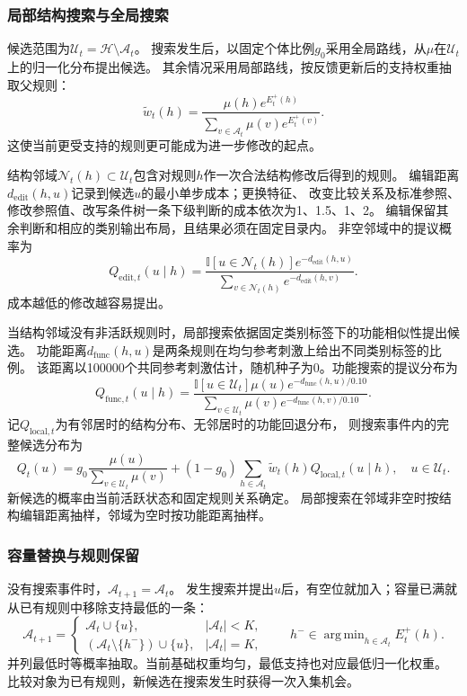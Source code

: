 \documentclass[11pt,a4paper]{article}
\numberwithin{equation}{section}
\newcommand{\ind}{\mathbb{I}}
\newcommand{\A}{\mathcal{A}}
\newcommand{\Hh}{\mathcal{H}}
\DeclareMathOperator*{\argmin}{arg\,min}
\begin{document}
\subsubsection{局部结构搜索与全局搜索}
\label{sec:proposal}
候选范围为$\mathcal U_t=\Hh\setminus\A_t$。
搜索发生后，以固定个体比例$g_0$采用全局路线，从$\mu$在$\mathcal U_t$上的归一化分布提出候选。
其余情况采用局部路线，按反馈更新后的支持权重抽取父规则：
\begin{equation}
\widetilde w_t(h)=\frac{\mu(h)e^{E_t^+(h)}}{\sum_{v\in\A_t}\mu(v)e^{E_t^+(v)}}.
\label{eq:updated-weight}
\end{equation}
这使当前更受支持的规则更可能成为进一步修改的起点。

结构邻域$\mathcal N_t(h)\subset\mathcal U_t$包含对规则$h$作一次合法结构修改后得到的规则。
编辑距离$d_{\mathrm{edit}}(h,u)$记录到候选$u$的最小单步成本；更换特征、
改变比较关系及标准参照、修改参照值、改写条件树一条下级判断的成本依次为1、1.5、1、2。
编辑保留其余判断和相应的类别输出布局，且结果必须在固定目录内。
非空邻域中的提议概率为
\begin{equation}
Q_{\mathrm{edit},t}(u\mid h)=
\frac{\ind[u\in\mathcal N_t(h)]e^{-d_{\mathrm{edit}}(h,u)}}
{\sum_{v\in\mathcal N_t(h)}e^{-d_{\mathrm{edit}}(h,v)}}.
\end{equation}
成本越低的修改越容易提出。

当结构邻域没有非活跃规则时，局部搜索依据固定类别标签下的功能相似性提出候选。
功能距离$d_{\mathrm{func}}(h,u)$是两条规则在均匀参考刺激上给出不同类别标签的比例。
该距离以100000个共同参考刺激估计，随机种子为0。功能搜索的提议分布为
\begin{equation}
Q_{\mathrm{func},t}(u\mid h)=
\frac{\ind[u\in\mathcal U_t]\mu(u)e^{-d_{\mathrm{func}}(h,u)/0.10}}
{\sum_{v\in\mathcal U_t}\mu(v)e^{-d_{\mathrm{func}}(h,v)/0.10}}.
\end{equation}
记$Q_{\mathrm{local},t}$为有邻居时的结构分布、无邻居时的功能回退分布，
则搜索事件内的完整候选分布为
\begin{equation}
Q_t(u)=g_0\frac{\mu(u)}{\sum_{v\in\mathcal U_t}\mu(v)}
+(1-g_0)\sum_{h\in\A_t}\widetilde w_t(h)Q_{\mathrm{local},t}(u\mid h),
\quad u\in\mathcal U_t.
\label{eq:proposal}
\end{equation}
新候选的概率由当前活跃状态和固定规则关系确定。
局部搜索在邻域非空时按结构编辑距离抽样，邻域为空时按功能距离抽样。

\subsubsection{容量替换与规则保留}
\label{sec:replacement}
没有搜索事件时，$\A_{t+1}=\A_t$。
发生搜索并提出$u$后，有空位就加入；容量已满就从已有规则中移除支持最低的一条：
\begin{equation}
\A_{t+1}=\begin{cases}
\A_t\cup\{u\},&|\A_t|<K,\\
(\A_t\setminus\{h^-\})\cup\{u\},&|\A_t|=K,
\end{cases}
\qquad h^-\in\argmin_{h\in\A_t}E_t^+(h).
\label{eq:replacement}
\end{equation}
并列最低时等概率抽取。当前基础权重均匀，最低支持也对应最低归一化权重。
比较对象为已有规则，新候选在搜索发生时获得一次入集机会。
\end{document}
